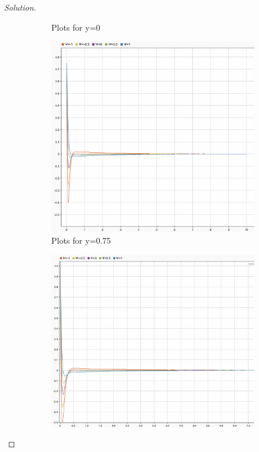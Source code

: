 \documentclass{article}
\begin{document}
\begin{proof}[Solution]
\begin{figure}
\begin{subfigure}{0.4\linewidth}
      \caption{Plots for y=0}
    \end{subfigure}
    \begin{subfigure}{0.4\linewidth}
      \includegraphics[width=\linewidth]{img3.png}
      \caption{Plots for y=0.75}
    \end{subfigure}
    \begin{subfigure}{0.4\linewidth}
        \includegraphics[width=\linewidth]{img4.png}

\end{subfigure}
\end{figure}
\end{proof}
\end{document}
